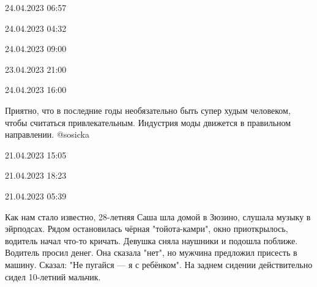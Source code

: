 \documentclass{article}
\begin{document}
\begin{multicols}{3}
\begin{window}
24.04.2023 06:57\end{window}
\closearticle
{}

\begin{window}

24.04.2023 04:32 \end{window}
\closearticle
{}



24.04.2023 09:00\closearticle
{}



23.04.2023 21:00\closearticle
{}



24.04.2023 16:00\closearticle
{}

\begin{window} 
Приятно, что в последние годы необязательно быть супер худым человеком, чтобы считаться привлекательным. Индустрия моды движется в правильном направлении. @sosicka

21.04.2023 15:05\end{window}
\closearticle
{}

\begin{window}

21.04.2023 18:23 \end{window}
\closearticle
{}

\begin{window}

21.04.2023 05:39 \end{window}
\closearticle
{}


Как нам стало известно, 28-летняя Саша шла домой в Зюзино, слушала музыку в эйрподсах. Рядом остановилась чёрная "тойота-камри", окно приоткрылось, водитель начал что-то кричать. Девушка сняла наушники и подошла поближе. Водитель просил денег. Она сказала "нет", но мужчина предложил присесть в машину. Сказал: "Не пугайся — я с ребёнком". На заднем сидении действительно сидел 10-летний мальчик. 


\end{multicols}
\end{document}
